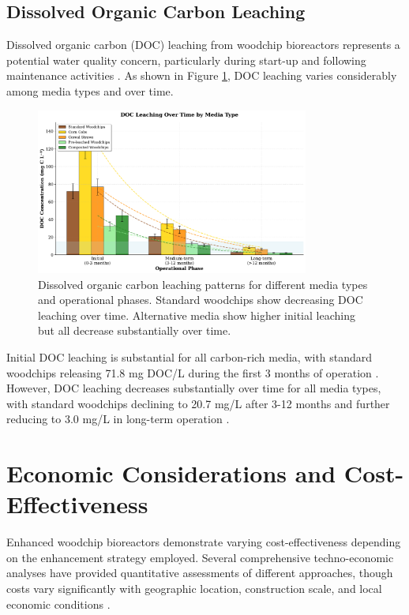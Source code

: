 \documentclass[12pt,a4paper]{article}
\begin{document}
\subsection{Dissolved Organic Carbon Leaching}

Dissolved organic carbon (DOC) leaching from woodchip bioreactors represents a potential water quality concern, particularly during start-up and following maintenance activities \citep{RN625, RN242}. As shown in Figure \ref{fig:doc_leaching}, DOC leaching varies considerably among media types and over time.

\begin{figure}[ht]
\centering
\includegraphics[width=0.8\textwidth]{fig8_doc_leaching_scientific}
\caption{Dissolved organic carbon leaching patterns for different media types and operational phases. Standard woodchips show decreasing DOC leaching over time. Alternative media show higher initial leaching but all decrease substantially over time.}
\label{fig:doc_leaching}
\end{figure}

Initial DOC leaching is substantial for all carbon-rich media, with standard woodchips releasing 71.8 mg DOC/L during the first 3 months of operation \citep{RN625}. However, DOC leaching decreases substantially over time for all media types, with standard woodchips declining to 20.7 mg/L after 3-12 months and further reducing to 3.0 mg/L in long-term operation \citep{RN625}.

\section{Economic Considerations and Cost-Effectiveness}

Enhanced woodchip bioreactors demonstrate varying cost-effectiveness depending on the enhancement strategy employed. Several comprehensive techno-economic analyses have provided quantitative assessments of different approaches, though costs vary significantly with geographic location, construction scale, and local economic conditions \citep{RN312, RN312}.
\end{document}
